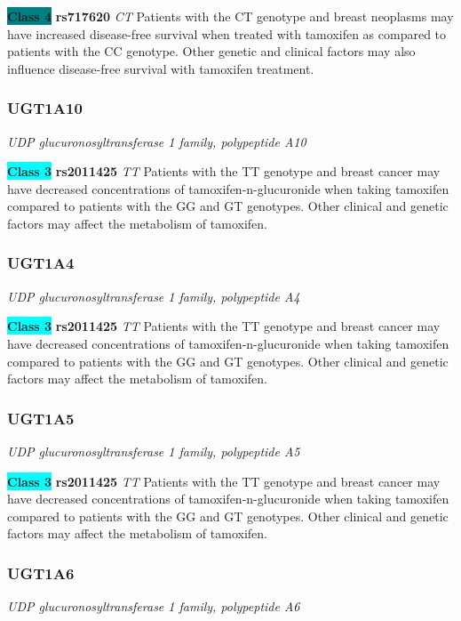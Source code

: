 \documentclass{report}
\begin{document}
\textbf{\colorbox{teal} {Class 4}} \textbf{ rs717620 } \textit{ CT }
Patients with the CT genotype and breast neoplasms may have increased disease-free survival when treated with tamoxifen as compared to patients with the CC genotype. Other genetic and clinical factors may also influence disease-free survival with tamoxifen treatment.\newline\subsubsection{ UGT1A10 }
\textit{ UDP glucuronosyltransferase 1 family, polypeptide A10 }

\textbf{\colorbox{cyan} {Class 3}} \textbf{ rs2011425 } \textit{ TT }
Patients with the TT genotype and breast cancer may have decreased concentrations of tamoxifen-n-glucuronide when taking tamoxifen compared to patients with the GG and GT genotypes. Other clinical and genetic factors may affect the metabolism of tamoxifen.\newline\subsubsection{ UGT1A4 }
\textit{ UDP glucuronosyltransferase 1 family, polypeptide A4 }

\textbf{\colorbox{cyan} {Class 3}} \textbf{ rs2011425 } \textit{ TT }
Patients with the TT genotype and breast cancer may have decreased concentrations of tamoxifen-n-glucuronide when taking tamoxifen compared to patients with the GG and GT genotypes. Other clinical and genetic factors may affect the metabolism of tamoxifen.\newline\subsubsection{ UGT1A5 }
\textit{ UDP glucuronosyltransferase 1 family, polypeptide A5 }

\textbf{\colorbox{cyan} {Class 3}} \textbf{ rs2011425 } \textit{ TT }
Patients with the TT genotype and breast cancer may have decreased concentrations of tamoxifen-n-glucuronide when taking tamoxifen compared to patients with the GG and GT genotypes. Other clinical and genetic factors may affect the metabolism of tamoxifen.\newline\subsubsection{ UGT1A6 }
\textit{ UDP glucuronosyltransferase 1 family, polypeptide A6 }
\end{document}
